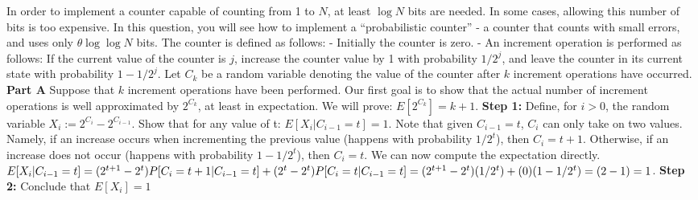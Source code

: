 \documentclass[12pt]{article}
\begin{document}
In order to implement a counter capable of counting from 1 to $N$, at least $\log N$ bits are needed. In some cases,
allowing this number of bits is too expensive. In this question, you will see how to implement a ``probabilistic counter''
- a counter that counts with small errors, and uses only $\theta \log \log N$ bits.
\newline
\newline
The counter is defined as follows:
\newline
	- Initially the counter is zero.\newline
	- An increment operation is performed as follows: If the current value of the counter is $j$, increase the counter value by 
	1 with probability $1/2^j$, and leave the counter in its current state with probability $1 - 1/2^j$.
\newline
\newline
Let $C_k$ be a random variable denoting the value of the counter after $k$ increment operations have occurred.
\newline
\newline
\textbf{Part A} Suppose that $k$ increment operations have been performed. Our first goal is to show that the actual number of
increment operations is well approximated by $2^{C_k}$, at least in expectation. We will prove: $E[2^{C_k}] = k + 1$.
\newline
\newline
\textbf{Step 1: } Define, for $i > 0$, the random variable $X_i := 2^{C_i} - 2^{C_{i-1}}$. Show that for any value
of t: $E[X_i | C_{i-1} = t] = 1$.
\newline
\newline
Note that given $C_{i-1} = t$, $C_i$ can only take on two values. Namely, if an increase occurs when incrementing the
previous value (happens with probability $1/2^t$), then $C_i = t+1$. Otherwise, if an increase does not occur (happens with
probability $1 - 1/2^t$), then $C_i = t$. We can now compute the expectation directly.
\newline
\newline
$E[X_i | C_{i-1} = t] = (2^{t+1} - 2^t) P[C_i = t+1 | C_{i-1} = t] + (2^t - 2^t) P[C_i = t | C_{i-1} = t] 
\newline = (2^{t+1} - 2^t)(1/2^t) + (0)(1 - 1/2^t) = (2 - 1) = 1$. 
\newline
\newline
\textbf{Step 2: } Conclude that $E[X_i] = 1$
\newline
\newline
\end{document}
